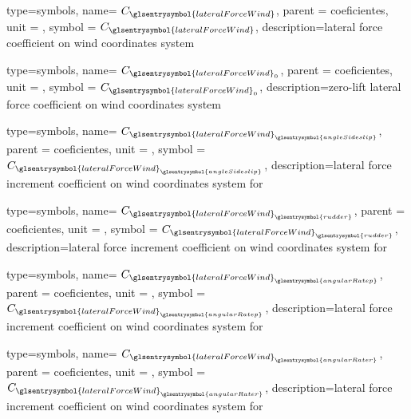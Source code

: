 {type=symbols,
    name= \ensuremath{C_{\glsentrysymbol{lateralForceWind}}},
    parent = {coeficientes},
    unit = \unexpanded{},
    symbol = \ensuremath{C_{\glsentrysymbol{lateralForceWind}}},
    description={lateral force coefficient on wind coordinates system }
}

{type=symbols,
    name= \ensuremath{C_{\glsentrysymbol{lateralForceWind}_{0}}},
    parent = {coeficientes},
    unit = \unexpanded{},
    symbol = \ensuremath{C_{\glsentrysymbol{lateralForceWind}_{0}}},
    description={zero-lift lateral force coefficient on wind coordinates system }
}

{type=symbols,
    name= \ensuremath{C_{{\glsentrysymbol{lateralForceWind}}_{\glsentrysymbol{angleSideslip}}}},
    parent = {coeficientes},
    unit = \unexpanded{},
    symbol = \ensuremath{C_{{\glsentrysymbol{lateralForceWind}}_{\glsentrysymbol{angleSideslip}}}},
    description={lateral force increment coefficient on wind coordinates system  for }
}

{type=symbols,
    name= \ensuremath{C_{{\glsentrysymbol{lateralForceWind}}_{\glsentrysymbol{rudder}}}},
    parent = {coeficientes},
    unit = \unexpanded{},
    symbol = \ensuremath{C_{{\glsentrysymbol{lateralForceWind}}_{\glsentrysymbol{rudder}}}},
    description={lateral force increment coefficient on wind coordinates system  for }
}


{type=symbols,
    name= \ensuremath{C_{{\glsentrysymbol{lateralForceWind}}_{\glsentrysymbol{angularRatep}}}},
    parent = {coeficientes},
    unit = \unexpanded{},
    symbol = \ensuremath{C_{{\glsentrysymbol{lateralForceWind}}_{\glsentrysymbol{angularRatep}}}},
    description={lateral force increment coefficient on wind coordinates system  for }
}

{type=symbols,
    name= \ensuremath{C_{{\glsentrysymbol{lateralForceWind}}_{\glsentrysymbol{angularRater}}}},
    parent = {coeficientes},
    unit = \unexpanded{},
    symbol = \ensuremath{C_{{\glsentrysymbol{lateralForceWind}}_{\glsentrysymbol{angularRater}}}},
    description={lateral force increment coefficient on wind coordinates system  for }
}


